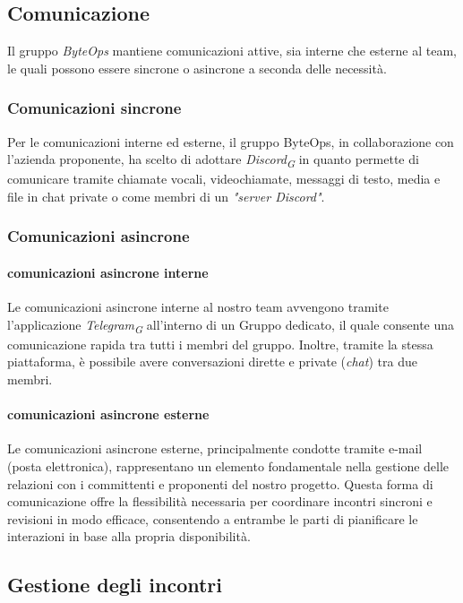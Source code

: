 \documentclass{article}
\begin{document}
    \subsection{Comunicazione}
    Il gruppo \textit{ByteOps} mantiene comunicazioni attive, sia interne che esterne al team, le quali possono essere sincrone o asincrone a seconda delle necessità.
    \subsubsection{Comunicazioni sincrone}
    Per le comunicazioni interne ed esterne, il gruppo ByteOps, in collaborazione con l'azienda proponente, ha scelto di adottare \textit{Discord}\textsubscript{\textit{G}} in quanto permette di comunicare tramite chiamate vocali, videochiamate, messaggi di testo, media e file in chat private o come membri di un \textit{"server Discord"}.
    \subsubsection{Comunicazioni asincrone}
        \paragraph{comunicazioni asincrone interne}
        Le comunicazioni asincrone interne al nostro team avvengono tramite l'applicazione \textit{Telegram}\textsubscript{\textit{G}} all'interno di un Gruppo dedicato, il quale consente una comunicazione rapida tra tutti i membri del gruppo. Inoltre, tramite la stessa piattaforma, è possibile avere conversazioni dirette e private (\textit{chat}) tra due membri.
        \paragraph{comunicazioni asincrone esterne}
        Le comunicazioni asincrone esterne, principalmente condotte tramite e-mail (posta elettronica), rappresentano un elemento fondamentale nella gestione delle relazioni con i committenti e proponenti del nostro progetto. Questa forma di comunicazione offre la flessibilità necessaria per coordinare incontri sincroni e revisioni in modo efficace, consentendo a entrambe le parti di pianificare le interazioni in base alla propria disponibilità. 
    
    \subsection{Gestione degli incontri}
\end{document}
